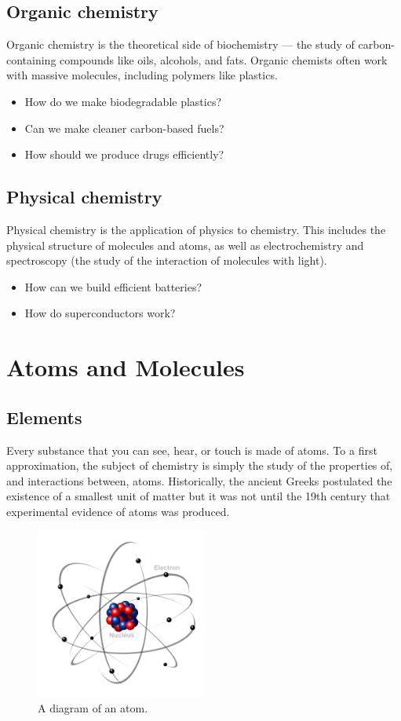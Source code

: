 \documentclass[a4paper]{memoir}
\begin{document}
\section{Organic chemistry}
Organic chemistry is the theoretical side of biochemistry --- the study of carbon-containing compounds like oils, alcohols, and fats. Organic
chemists often work with massive molecules, including polymers like plastics.
\begin{itemize}
  \item How do we make biodegradable plastics?
  \item Can we make cleaner carbon-based fuels?
  \item How should we produce drugs efficiently?
\end{itemize}

\section{Physical chemistry}
Physical chemistry is the application of physics to chemistry. This includes the physical structure of molecules and atoms, as well as
electrochemistry and spectroscopy (the study of the interaction of molecules with light).
\begin{itemize}
  \item How can we build efficient batteries?
  \item How do superconductors work?
\end{itemize}

\chapter{Atoms and Molecules}
\section{Elements}
Every substance that you can see, hear, or touch is made of atoms. To a first approximation, the subject of chemistry is simply the
study of the properties of, and interactions between, atoms. Historically, the ancient Greeks postulated the existence of a smallest
unit of matter but it was not until the 19th century that experimental evidence of atoms was produced.

\begin{figure}
  \centering
  \includegraphics[width=0.5\textwidth]{atom}
  \caption{A diagram of an atom.\label{fig:atom}}
\end{figure}
\end{document}
